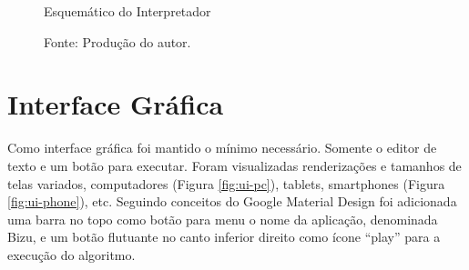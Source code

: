 \begin{figure}[h]
  \caption{Esquemático do Interpretador}\label{fig:flux}
  \centering
  \setlength{\fboxsep}{0pt}%
\setlength{\fboxrule}{1pt}%
  \caption*{\footnotesize Fonte: Produção do autor.}
\end{figure}

\section{Interface Gráfica}

Como interface gráfica foi mantido o mínimo necessário. Somente o editor de texto e um botão para executar. Foram visualizadas renderizações e tamanhos de telas variados, computadores (Figura \ref{fig:ui-pc}), tablets, smartphones (Figura \ref{fig:ui-phone}), etc. Seguindo conceitos do Google Material Design foi adicionada uma barra no topo como botão para menu o nome da aplicação, denominada Bizu, e um botão flutuante no canto inferior direito como ícone ``play'' para a execução do algoritmo.


